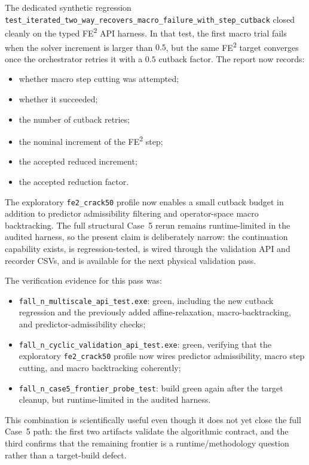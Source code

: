 The dedicated synthetic regression
\texttt{test\_iterated\_two\_way\_recovers\_macro\_failure\_with\_step\_cutback}
closed cleanly on the typed FE\textsuperscript{2} API harness.  In that test,
the first macro trial fails when the solver increment is larger than \(0.5\),
but the same FE\textsuperscript{2} target converges once the orchestrator
retries it with a \(0.5\) cutback factor.  The report now records:
\begin{itemize}
  \item whether macro step cutting was attempted;
  \item whether it succeeded;
  \item the number of cutback retries;
  \item the nominal increment of the FE\textsuperscript{2} step;
  \item the accepted reduced increment;
  \item the accepted reduction factor.
\end{itemize}
The exploratory \texttt{fe2\_crack50} profile now enables a small cutback
budget in addition to predictor admissibility filtering and operator-space
macro backtracking.  The full structural Case~5 rerun remains runtime-limited
in the audited harness, so the present claim is deliberately narrow: the
continuation capability exists, is regression-tested, is wired through the
validation API and recorder CSVs, and is available for the next physical
validation pass.

The verification evidence for this pass was:
\begin{itemize}
  \item \texttt{fall\_n\_multiscale\_api\_test.exe}: green, including the new
    cutback regression and the previously added affine-relaxation,
    macro-backtracking, and predictor-admissibility checks;
  \item \texttt{fall\_n\_cyclic\_validation\_api\_test.exe}: green, verifying
    that the exploratory \texttt{fe2\_crack50} profile now wires predictor
    admissibility, macro step cutting, and macro backtracking coherently;
  \item \texttt{fall\_n\_case5\_frontier\_probe\_test}: build green again after
    the target cleanup, but runtime-limited in the audited harness.
\end{itemize}
This combination is scientifically useful even though it does not yet close the
full Case~5 path: the first two artifacts validate the algorithmic contract,
and the third confirms that the remaining frontier is a runtime/methodology
question rather than a target-build defect.

